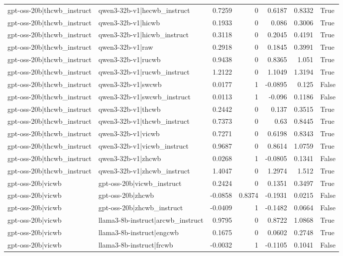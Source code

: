 \begin{table}
\begin{tabular}{l l r r r r l}
gpt-oss-20b|thcwb_instruct & qwen3-32b-v1|hecwb_instruct & 0.7259 & 0 & 0.6187 & 0.8332 & True \\
gpt-oss-20b|thcwb_instruct & qwen3-32b-v1|hicwb & 0.1933 & 0 & 0.086 & 0.3006 & True \\
gpt-oss-20b|thcwb_instruct & qwen3-32b-v1|hicwb_instruct & 0.3118 & 0 & 0.2045 & 0.4191 & True \\
gpt-oss-20b|thcwb_instruct & qwen3-32b-v1|raw & 0.2918 & 0 & 0.1845 & 0.3991 & True \\
gpt-oss-20b|thcwb_instruct & qwen3-32b-v1|rucwb & 0.9438 & 0 & 0.8365 & 1.051 & True \\
gpt-oss-20b|thcwb_instruct & qwen3-32b-v1|rucwb_instruct & 1.2122 & 0 & 1.1049 & 1.3194 & True \\
gpt-oss-20b|thcwb_instruct & qwen3-32b-v1|swcwb & 0.0177 & 1 & -0.0895 & 0.125 & False \\
gpt-oss-20b|thcwb_instruct & qwen3-32b-v1|swcwb_instruct & 0.0113 & 1 & -0.096 & 0.1186 & False \\
gpt-oss-20b|thcwb_instruct & qwen3-32b-v1|thcwb & 0.2442 & 0 & 0.137 & 0.3515 & True \\
gpt-oss-20b|thcwb_instruct & qwen3-32b-v1|thcwb_instruct & 0.7373 & 0 & 0.63 & 0.8445 & True \\
gpt-oss-20b|thcwb_instruct & qwen3-32b-v1|vicwb & 0.7271 & 0 & 0.6198 & 0.8343 & True \\
gpt-oss-20b|thcwb_instruct & qwen3-32b-v1|vicwb_instruct & 0.9687 & 0 & 0.8614 & 1.0759 & True \\
gpt-oss-20b|thcwb_instruct & qwen3-32b-v1|zhcwb & 0.0268 & 1 & -0.0805 & 0.1341 & False \\
gpt-oss-20b|thcwb_instruct & qwen3-32b-v1|zhcwb_instruct & 1.4047 & 0 & 1.2974 & 1.512 & True \\
gpt-oss-20b|vicwb & gpt-oss-20b|vicwb_instruct & 0.2424 & 0 & 0.1351 & 0.3497 & True \\
gpt-oss-20b|vicwb & gpt-oss-20b|zhcwb & -0.0858 & 0.8374 & -0.1931 & 0.0215 & False \\
gpt-oss-20b|vicwb & gpt-oss-20b|zhcwb_instruct & -0.0409 & 1 & -0.1482 & 0.0664 & False \\
gpt-oss-20b|vicwb & llama3-8b-instruct|arcwb_instruct & 0.9795 & 0 & 0.8722 & 1.0868 & True \\
gpt-oss-20b|vicwb & llama3-8b-instruct|engcwb & 0.1675 & 0 & 0.0602 & 0.2748 & True \\
gpt-oss-20b|vicwb & llama3-8b-instruct|frcwb & -0.0032 & 1 & -0.1105 & 0.1041 & False \\

\end{tabular}
\end{table}
